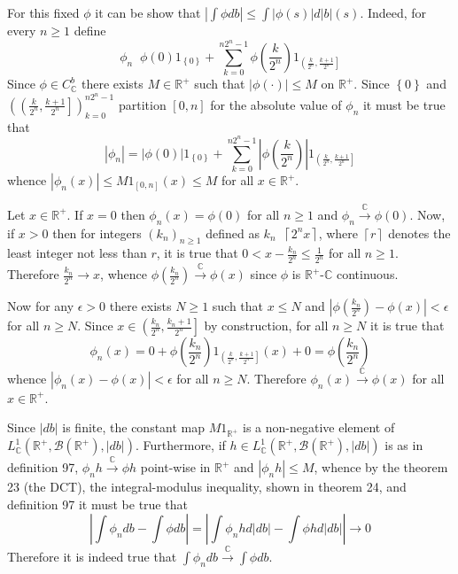 \documentclass[a4paper]{article}
\newcommand{\obj}[1]{\left\{ #1 \right \}}
\newcommand{\clo}[1]{\left [ #1 \right ]}
\newcommand{\ploc}[1]{\left ( #1 \right ]}
\newcommand{\brac}[1]{\left ( #1 \right )}
\newcommand{\abs}[1]{\left | #1 \right |}
\newcommand{\Real}{\mathbb{R}}
\newcommand{\Cplx}{\mathbb{C}}
\newcommand{\borel}[1]{\mathcal{B}\brac{#1}}
\newcommand{\defn}{\mathop{\overset{\Delta}{=}}\nolimits}
\begin{document}
For this fixed $\phi$ it can be show that $\abs{\int \phi db} \leq \int \abs{\phi\brac{s}}d\abs{b}\brac{s}$. Indeed, for every $n\geq1$ define \[\phi_n\defn \phi\brac{0} 1_{\obj{0}} + \sum_{k=0}^{n 2^n-1} \phi\brac{\frac{k}{2^n}} 1_{\ploc{ \frac{k}{2^n}, \frac{k+1}{2^n} }}\] Since $\phi\in C^b_\Cplx$ there exists $M\in \Real^+$ such that $\abs{\phi\brac{\cdot}}\leq M$ on $\Real^+$. Since $\obj{0}$ and $\brac{\ploc{ \frac{k}{2^n}, \frac{k+1}{2^n} } }_{k=0}^{n 2^n-1}$ partition $\clo{0,n}$ for the absolute value of $\phi_n$ it must be true that \[\abs{\phi_n} = \abs{\phi\brac{0}} 1_{\obj{0}} + \sum_{k=0}^{n 2^n-1} \abs{\phi\brac{\frac{k}{2^n}}} 1_{\ploc{ \frac{k}{2^n}, \frac{k+1}{2^n} }}\] whence $\abs{\phi_n\brac{x}}\leq M 1_{\clo{0,n}}\brac{x}\leq M$ for all $x\in\Real^+$.

Let $x\in \Real^+$. If $x=0$ then $\phi_n\brac{x} = \phi\brac{0}$ for all $n\geq1$ and $\phi_n\overset{\Cplx}{\to}\phi\brac{0}$. Now, if $x>0$ then for integers $\brac{k_n}_{n\geq1}$ defined as $k_n\defn \left \lceil 2^n x\right \rceil$, where $\left \lceil r \right \rceil$ denotes the least integer not less than $r$, it is true that $0<x-\frac{k_n}{2^n}\leq \frac{1}{2^n}$ for all $n\geq 1$. Therefore $\frac{k_n}{2^n}\to x$, whence $\phi\brac{\frac{k_n}{2^n}}\overset{\Cplx}{\to}\phi\brac{x}$ since $\phi$ is $\Real^+$-$\Cplx$ continuous.

Now for any $\epsilon>0$ there exists $N\geq 1$ such that $x \leq N$ and $\abs{\phi\brac{\frac{k_n}{2^n}}-\phi\brac{x}}<\epsilon$ for all $n\geq N$. Since $x\in \ploc{ \frac{k_n}{2^n}, \frac{k_n+1}{2^n} }$ by construction, for all $n\geq N$ it is true that \[\phi_n\brac{x}=0+\phi\brac{\frac{k_n}{2^n}} 1_{\ploc{ \frac{k}{2^n}, \frac{k+1}{2^n} }}\brac{x}+0 = \phi\brac{\frac{k_n}{2^n}}\] whence $\abs{\phi_n\brac{x}-\phi\brac{x}}<\epsilon$ for all $n\geq N$. Therefore $\phi_n\brac{x}\overset{\Cplx}{\to} \phi\brac{x}$ for all $x\in \Real^+$.

Since $\abs{db}$ is finite, the constant map $M 1_{\Real^+}$ is a non-negative element of $L^1_\Cplx\brac{\Real^+, \borel{\Real^+}, \abs{db}}$. Furthermore, if $h\in L^1_\Cplx\brac{\Real^+, \borel{\Real^+}, \abs{db}}$ is as in definition 97, $\phi_n h \overset{\Cplx}{\to} \phi h$ point-wise in $\Real^+$ and $\abs{\phi_n h}\leq M$, whence by the theorem 23 (the DCT), the integral-modulus inequality, shown in theorem 24, and definition 97 it must be true that \[\abs{\int \phi_n db - \int \phi db } = \abs{\int \phi_n h d\abs{db}-\int \phi h d\abs{db}} \to 0\] Therefore it is indeed true that $\int \phi_n db \overset{\Cplx}{\to} \int \phi db$.
\end{document}
